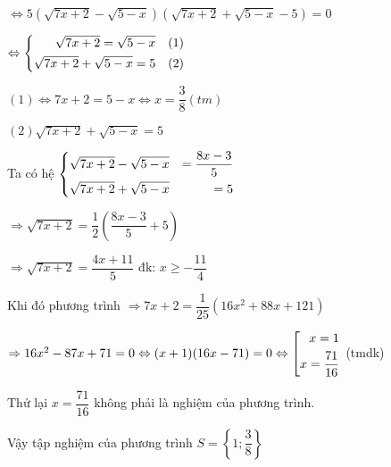 \begin{ex}
{\begin{enumerate}
         $\Leftrightarrow 5(\sqrt{7x+2}-\sqrt{5-x})(\sqrt{7x+2}+\sqrt{5-x}-5) = 0$
         
        $\Leftrightarrow \left\{\begin{aligned}\sqrt{7x+2}=\sqrt{5-x} \quad (1)\\ \sqrt{7x+2}+\sqrt{5-x} = 5 \quad (2)\end{aligned}\right.$
        
        $(1)\Leftrightarrow 7x+2 = 5-x \Leftrightarrow x=  \dfrac{3}{8} (tm)$
        
        $(2) \sqrt{7x+2}+\sqrt{5-x} = 5$
        
        Ta có hệ $\left\{\begin{aligned}&\sqrt{7x+2}-\sqrt{5-x}& = \dfrac{8x-3}{5}\\&\sqrt{7x+2}+\sqrt{5-x}& = 5\end{aligned}\right.$
        
        $\Rightarrow \sqrt{7x+2} = \dfrac{1}{2}\left(\dfrac{8x-3}{5}+5\right)$
        
                $\Rightarrow \sqrt{7x+2} = \dfrac{4x+11}{5}$ đk: $x\geq -\dfrac{11}{4}$

Khi đó phương trình $\Rightarrow 7x+2 =\dfrac{1}{25}(16x^2+88x+121)$

$\Rightarrow 16x^2-87x+71 = 0 \Leftrightarrow (x+1)(16x-71) = 0\Leftrightarrow \left[\begin{aligned}x = 1\\x=\dfrac{71}{16}\end{aligned}\right.$ (tmdk)

Thử lại $x = \dfrac{71}{16}$ không phải là nghiệm của phương trình.

Vậy tập nghiệm của phương trình $S = \left\{1; \dfrac{3}{8}\right\}$
    \end{enumerate}
    }
\end{ex}

